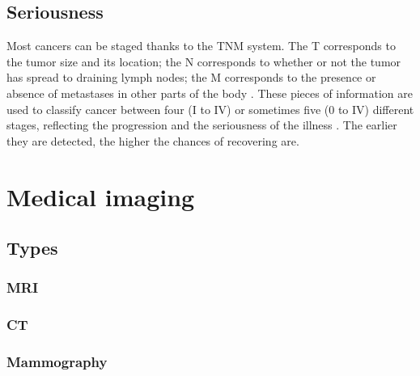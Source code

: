 \subsection{Seriousness}

Most cancers can be staged thanks to the TNM system. The T corresponds to the tumor size and its location; the N corresponds to whether or not the tumor has spread to draining lymph nodes; the M corresponds to the presence or absence of metastases in other parts of the body \cite{21}. These pieces of information are used to classify cancer between four (I to IV) or sometimes five (0 to IV) different stages, reflecting the progression and the seriousness of the illness \cite{22}. The earlier they are detected, the higher the chances of recovering are.



\section{Medical imaging}
\label{sec:medical_imaging}

\subsection{Types}

\subsubsection{MRI}

\subsubsection{CT}

\subsubsection{Mammography}